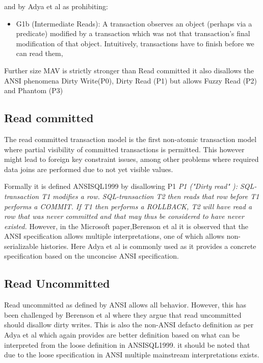 \documentclass[a4paper,10pt,titlepage]{report}
\begin{document}
    and by Adya et al\cite{Adya99weakconsistency} as prohibiting:
    \begin{itemize}
        \item G1b (Intermediate Reads): A transaction observes an object (perhaps via a predicate) modified by a transaction which was not that transaction's final modification of that object. Intuitively, transactions have to finish before we can read them,
    \end{itemize}

    Further size MAV is strictly stronger than Read committed it also disallows the ANSI phenomena Dirty Write(P0), Dirty Read (P1) but allows Fuzzy Read (P2) and Phantom (P3)

    \subsection{Read committed}
    The read committed transaction model is the first non-atomic transaction model where partial visibility of committed transactions is permitted. This however might lead to foreign key constraint issues, among other problems where required data joins are performed due to not yet visible values.


    Formally it is defined ANSISQL1999\cite{ansisql1999} by disallowing P1
    \textit{P1 ("Dirty read" ): SQL-transaction T1 modifies a row. SQL-transaction T2 then reads that row before T1 performs a COMMIT. If T1 then performs a ROLLBACK, T2 will have read a row that was never committed and that may thus be considered to have never existed.} However, in the Microsoft paper,Berenson et al \cite{Berensonetal} it is observed that the ANSI specification allows multiple interpretations, one of which allows non-serializable histories. Here Adya et al\cite{Adya99weakconsistency} is commonly used as it provides a concrete specification based on the unconcise ANSI specification.



    \subsection{Read Uncommitted}
    Read uncommitted as defined by ANSI allows all behavior. However, this has been challenged by Berenson et al\cite{Berensonetal} where they argue that read uncommitted should disallow dirty writes. This is also the non-ANSI defacto definition as per Adya et al \cite{Adya99weakconsistency} which again provides are better definition based on what can be interpreted from the loose definition in ANSISQL1999\cite{ansisql1999}. it should be noted that due to the loose specification in ANSI multiple mainstream interpretations exists.\\
\end{document}
